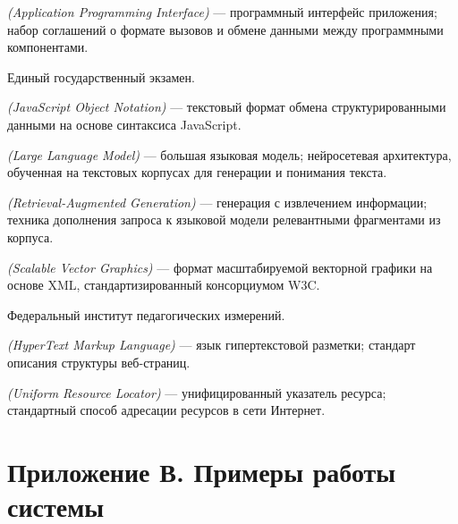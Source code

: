 \begin{description}
    \setlength{\itemsep}{2pt}
    \item[API] \textit{(Application Programming Interface)} --- программный интерфейс приложения; набор соглашений о формате вызовов и обмене данными между программными компонентами.
    \item[ЕГЭ] Единый государственный экзамен.
    \item[JSON] \textit{(JavaScript Object Notation)} --- текстовый формат обмена структурированными данными на основе синтаксиса JavaScript.
    \item[LLM] \textit{(Large Language Model)} --- большая языковая модель; нейросетевая архитектура, обученная на текстовых корпусах для генерации и понимания текста.
    \item[RAG] \textit{(Retrieval-Augmented Generation)} --- генерация с извлечением информации; техника дополнения запроса к языковой модели релевантными фрагментами из корпуса.
    \item[SVG] \textit{(Scalable Vector Graphics)} --- формат масштабируемой векторной графики на основе XML, стандартизированный консорциумом W3C.
    \item[ФИПИ] Федеральный институт педагогических измерений.
    \item[HTML] \textit{(HyperText Markup Language)} --- язык гипертекстовой разметки; стандарт описания структуры веб-страниц.
    \item[URL] \textit{(Uniform Resource Locator)} --- унифицированный указатель ресурса; стандартный способ адресации ресурсов в сети Интернет.
\end{description}

\newpage

\lstset{
    language=Python,
    basicstyle=\ttfamily\footnotesize,
    keywordstyle=\bfseries,
    commentstyle=\itshape,
    stringstyle=\ttfamily,
    numbers=left,
    numberstyle=\tiny,
    numbersep=6pt,
    stepnumber=1,
    frame=single,
    breaklines=true,
    breakatwhitespace=false,
    showstringspaces=false,
    keepspaces=true,
    tabsize=4,
    extendedchars=true,
}

\section*{Приложение В. Примеры работы системы}

